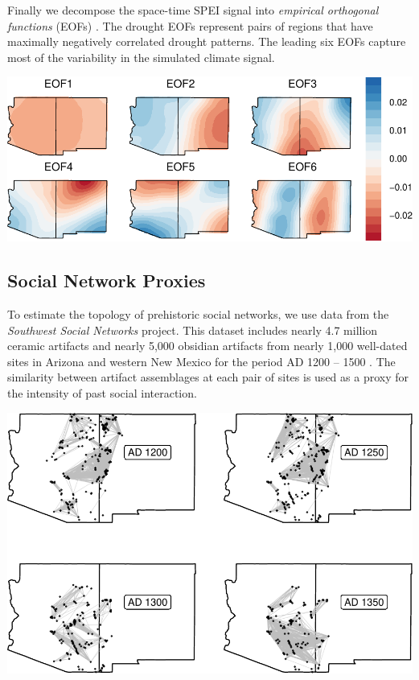 \documentclass[a0,final]{a0poster}
\begin{document}
\begin{multicols}{3}
\medskip
\noindent Finally we decompose the space-time SPEI signal into \textit{empirical orthogonal functions} (EOFs)  \cite{Lorenz1956EmpiricalPrediction}. The drought EOFs represent pairs of regions that have maximally negatively correlated drought patterns. The leading six EOFs capture most of the variability in the simulated climate signal.\\
\begin{center}
    \includegraphics[width = .9\columnwidth]{images/eofs}
\end{center}
\medskip


\columnbreak
\vspace*{\fill}
\subsection*{Social Network Proxies}
To estimate the topology of prehistoric social networks, we use data from the \textit{Southwest Social Networks} project. This dataset includes nearly 4.7 million ceramic artifacts and nearly 5,000 obsidian artifacts from nearly 1,000 well-dated sites in Arizona and western New Mexico for the period AD 1200 -- 1500 \cite{Mills2015a}. The similarity between artifact assemblages at each pair of sites is used as a proxy for the intensity of past social interaction.\\

\begin{center}
\includegraphics[width = .8\columnwidth]{images/swsn}
\end{center}
\vspace*{\fill}

\end{multicols}
\end{document}
